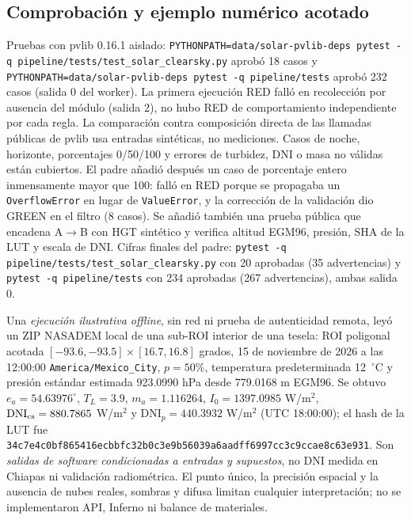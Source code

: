 \documentclass[11pt,a4paper]{article}
\begin{document}
\subsection{Comprobación y ejemplo numérico acotado}
Pruebas con pvlib 0.16.1 aislado: \texttt{PYTHONPATH=data/solar-pvlib-deps pytest -q pipeline/tests/test\_solar\_clearsky.py} aprobó 18 casos y \texttt{PYTHONPATH=data/solar-pvlib-deps pytest -q pipeline/tests} aprobó 232 casos (salida 0 del worker). La primera ejecución RED falló en recolección por ausencia del módulo (salida 2), no hubo RED de comportamiento independiente por cada regla. La comparación contra composición directa de las llamadas públicas de pvlib usa entradas sintéticas, no mediciones. Casos de noche, horizonte, porcentajes 0/50/100 y errores de turbidez, DNI o masa no válidas están cubiertos. El padre añadió después un caso de porcentaje entero inmensamente mayor que 100: falló en RED porque se propagaba un \texttt{OverflowError} en lugar de \texttt{ValueError}, y la corrección de la validación dio GREEN en el filtro (8 casos). Se añadió también una prueba pública que encadena A$\to$B con HGT sintético y verifica altitud EGM96, presión, SHA de la LUT y escala de DNI. Cifras finales del padre: \texttt{pytest -q pipeline/tests/test\_solar\_clearsky.py} con 20 aprobadas (35 advertencias) y \texttt{pytest -q pipeline/tests} con 234 aprobadas (267 advertencias), ambas salida 0.

Una \emph{ejecución ilustrativa offline}, sin red ni prueba de autenticidad remota, leyó un ZIP NASADEM local de una sub-ROI interior de una tesela: ROI poligonal acotada $[-93.6,-93.5]\times[16.7,16.8]$ grados, 15 de noviembre de 2026 a las 12:00:00 \texttt{America/Mexico\_City}, $p=50\%$, temperatura predeterminada 12~$^\circ$C y presión estándar estimada 923.0990 hPa desde 779.0168 m EGM96. Se obtuvo $e_a=54.63976^\circ$, $T_L=3.9$, $m_a=1.116264$, $I_0=1397.0985$ W/m$^2$, $\mathrm{DNI}_{\rm cs}=880.7865$ W/m$^2$ y $\mathrm{DNI}_{p}=440.3932$ W/m$^2$ (UTC 18:00:00); el hash de la LUT fue \texttt{34c7e4c0bf865416ecbbfc32b0c3e9b56039a6aadff6997cc3c9ccae8c63e931}. Son \emph{salidas de software condicionadas a entradas y supuestos}, no DNI medida en Chiapas ni validación radiométrica. El punto único, la precisión espacial y la ausencia de nubes reales, sombras y difusa limitan cualquier interpretación; no se implementaron API, Inferno ni balance de materiales.
\end{document}
